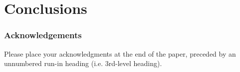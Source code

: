 \documentclass[runningheads]{llncs}
\begin{document}
\section{Conclusions}
\label{sec:conclusions}





\subsubsection{Acknowledgements} Please place your acknowledgments at
the end of the paper, preceded by an unnumbered run-in heading (i.e.
3rd-level heading).

%
%
%


%
\end{document}
